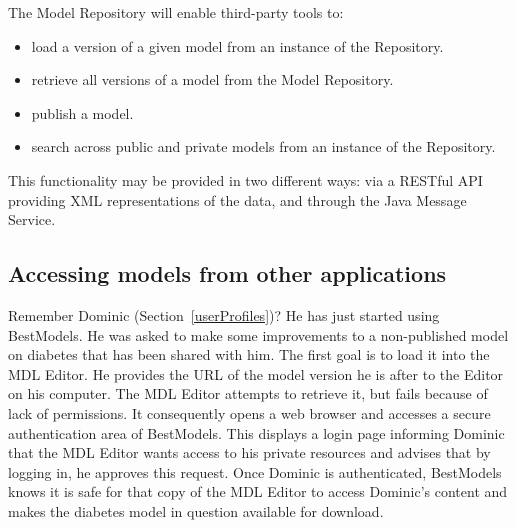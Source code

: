 The \ddmore Model Repository will enable third-party tools to:
\begin{itemize}
\item load a version of a given model from an instance of the Repository.
\item retrieve all versions of a model from the Model Repository.
\item publish a model.
\item search across public and private models from an instance of the Repository.
\end{itemize}

\begin{techNote}
This functionality may be provided in two different ways: via a RESTful API providing XML representations of the data, and through the Java Message Service. 
\end{techNote}


\subsection{Accessing models from other applications}
\label{remoteAuth}
Remember Dominic (Section~\ref{userProfiles})? He has just started using BestModels. He was asked to make some improvements to a non-published model on diabetes that has been shared with him. The first goal is to load it into the MDL Editor. He provides the URL of the model version he is after to the Editor on his computer. The MDL Editor attempts to retrieve it, but fails because of lack of permissions. It consequently opens a web browser and accesses a secure authentication area of BestModels. This displays a login page informing Dominic that the MDL Editor wants access to his private resources and advises that by logging in, he approves this request. Once Dominic is authenticated, BestModels knows it is safe for that copy of the MDL Editor to access Dominic's content and makes the diabetes model in question available for download. 

